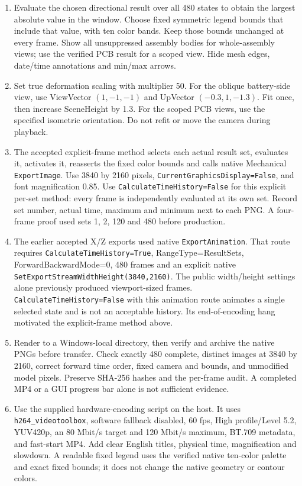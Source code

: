 \begin{enumerate}
\item Evaluate the chosen directional result over all 480 states to obtain the largest absolute value in the window. Choose fixed symmetric legend bounds that include that value, with ten color bands. Keep those bounds unchanged at every frame. Show all unsuppressed assembly bodies for whole-assembly views; use the verified PCB result for a scoped view. Hide mesh edges, date/time annotations and min/max arrows.
\item Set true deformation scaling with multiplier 50. For the oblique battery-side view, use ViewVector $(1,-1,-1)$ and UpVector $(-0.3,1,-1.3)$. Fit once, then increase SceneHeight by 1.3. For the scoped PCB views, use the specified isometric orientation. Do not refit or move the camera during playback.
\item The accepted explicit-frame method selects each actual result set, evaluates it, activates it, reasserts the fixed color bounds and calls native Mechanical \texttt{ExportImage}. Use 3840 by 2160 pixels, \texttt{CurrentGraphicsDisplay=False}, and font magnification 0.85. Use \texttt{CalculateTimeHistory=False} for this explicit per-set method: every frame is independently evaluated at its own set. Record set number, actual time, maximum and minimum next to each PNG. A four-frame proof used sets 1, 2, 120 and 480 before production.
\item The earlier accepted X/Z exports used native \texttt{ExportAnimation}. That route requires \texttt{CalculateTimeHistory=True}, RangeType=ResultSets, ForwardBackwardMode=0, 480 frames and an explicit native \texttt{SetExportStreamWidthHeight(3840,2160)}. The public width/height settings alone previously produced viewport-sized frames. \texttt{CalculateTimeHistory=False} with this animation route animates a single selected state and is not an acceptable history. Its end-of-encoding hang motivated the explicit-frame method above.
\item Render to a Windows-local directory, then verify and archive the native PNGs before transfer. Check exactly 480 complete, distinct images at 3840 by 2160, correct forward time order, fixed camera and bounds, and unmodified model pixels. Preserve SHA-256 hashes and the per-frame audit. A completed MP4 or a GUI progress bar alone is not sufficient evidence.
\item Use the supplied hardware-encoding script on the host. It uses \texttt{h264\_videotoolbox}, software fallback disabled, 60 fps, High profile/Level 5.2, YUV420p, an 80 Mbit/s target and 120 Mbit/s maximum, BT.709 metadata, and fast-start MP4. Add clear English titles, physical time, magnification and slowdown. A readable fixed legend uses the verified native ten-color palette and exact fixed bounds; it does not change the native geometry or contour colors.

\end{enumerate}
